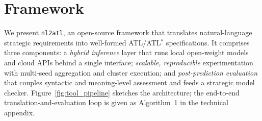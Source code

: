 \section{Framework}
\label{sec:framework}

We present \texttt{nl2atl}, an open-source framework that translates natural-language strategic requirements into well-formed ATL/ATL$^\ast$ specifications. It comprises three components: a \emph{hybrid inference} layer that runs local open-weight models and cloud APIs behind a single interface; \emph{scalable, reproducible} experimentation with multi-seed aggregation and cluster execution; and \emph{post-prediction evaluation} that couples syntactic and meaning-level assessment and feeds a strategic model checker. Figure~\ref{fig:tool_pipeline} sketches the architecture; the end-to-end translation-and-evaluation loop is given as Algorithm~1 in the technical appendix.

